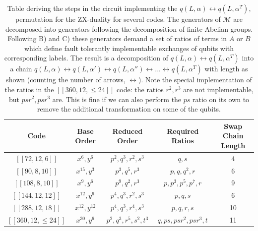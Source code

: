 \documentclass{article}
\begin{document}
\begin{table}
	\begin{center}
		\begin{tabular}{|c|c|c|c|c|}
			\hline
			Code & Base Order & Reduced Order & Required Ratios & Swap Chain Length \\ \hline \hline
			$[[72,12,6]]$ & $x^6, y^6$ &  $p^2, q^3, r^2, s^3$ & $q,s$ & 4 \\ \hline
			$[[90,8,10]]$ & $x^{15}, y^{3}$ & $p^3, q^5, r^{3}$ & $p, q, q^2, r$ & 6 \\ \hline
			$[[108,8,10]]$ & $x^9, y^6$ &  $p^9, q^2, r^3$ & $p, p^3, p^5, p^7, r$ & 9 \\ \hline
			$[[144,12,12]]$ & $x^{12}, y^6$ & $p^4, q^3, r^2, s^3$  & $p, q, s$ & 6 \\ \hline
			$[[288,12,18]]$ & $x^{12}, y^{12}$ & $p^4, q^{3}, r^4, s^3$ & $p,q,r,s$ & 10 \\ \hline
			$[[360,12,\leq24]]$ & $x^{30}, y^{6}$ & $p^2, q^3, r^5, s^2, t^3$ & $q, ps, psr^2, psr^3, t$ & 11 \\ \hline
		\end{tabular}
	\end{center}
     \caption{\label{table:duality_implementations} Table deriving the steps in the circuit implementing the $q(L,\alpha) \leftrightarrow q(L,\alpha^T)$, permutation for the ZX-duality for several codes. The generators of $\mathcal{M}$ are decomposed into generators following the decomposition of finite Abelian groups. Following  B) and C) these generators demand a set of ratios of terms in $A$ or $B$ which define fault tolerantly implementable exchanges of qubits with corresponding labels. The result is a decomposition of $q(L,\alpha) \leftrightarrow q(L,\alpha^T)$ into a chain $q(L,\alpha) \leftrightarrow q(L, \alpha')\leftrightarrow q(L, \alpha'') \leftrightarrow ... \leftrightarrow   q(L,\alpha^T)$ with length as shown (counting the number of arrows, $\leftrightarrow$).  Note the special implementation of the ratios in the $[[360,12,\leq24]]$ code: the ratios $r^2,r^3$ are not implementable, but $psr^2, psr^3$ are. This is fine if we can also perform the $ps$ ratio on its own to remove the additional transformation on some of the qubits.}
\end{table}
\end{document}
